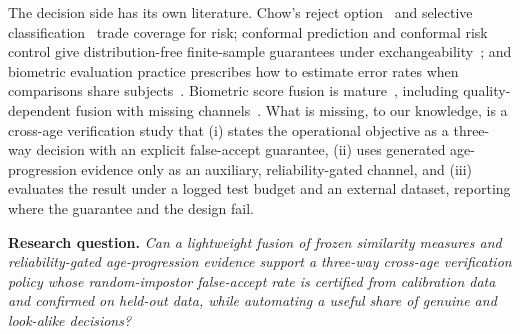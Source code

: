 \documentclass[journal]{IEEEtran}
\begin{document}
The decision side has its own literature. Chow's reject option~\cite{chow1970reject,herbei2006reject} and selective classification~\cite{elyaniv2010selective,geifman2017selective} trade coverage for risk; conformal prediction and conformal risk control give distribution-free finite-sample guarantees under exchangeability~\cite{vovk2005alrw,angelopoulos2024crc,angelopoulos2021ltt}; and biometric evaluation practice prescribes how to estimate error rates when comparisons share subjects~\cite{bolle2004subsets,schuckers2010book,iso19795_1}. Biometric score fusion is mature~\cite{kittler1998combining,ross2003fusion,nandakumar2008lr}, including quality-dependent fusion with missing channels~\cite{poh2009quality}. What is missing, to our knowledge, is a cross-age verification study that (i) states the operational objective as a three-way decision with an explicit false-accept guarantee, (ii) uses generated age-progression evidence only as an auxiliary, reliability-gated channel, and (iii) evaluates the result under a logged test budget and an external dataset, reporting where the guarantee and the design fail.

\textbf{Research question.} \emph{Can a lightweight fusion of frozen similarity measures and reliability-gated age-progression evidence support a three-way cross-age verification policy whose random-impostor false-accept rate is certified from calibration data and confirmed on held-out data, while automating a useful share of genuine and look-alike decisions?}
\end{document}
